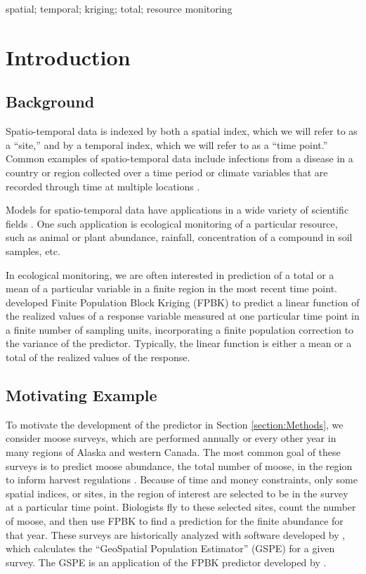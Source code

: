\documentclass[]{interact}
\theoremstyle{plain}%
\theoremstyle{definition}
\theoremstyle{remark}
\begin{document}
\begin{keywords}
spatial; temporal; kriging; total; resource monitoring
\end{keywords}

\section{Introduction}

\subsection{Background}

Spatio-temporal data is indexed by both a spatial index, which we will
refer to as a ``site,'' and by a temporal index, which we will refer to
as a ``time point.'' Common examples of spatio-temporal data include
infections from a disease in a country or region collected over a time
period \citep[e.g.][]{martinez2008autoregressive, sahu2022bayesian} or
climate variables that are recorded through time at multiple locations
\citep{lemos2009spatio}.

Models for spatio-temporal data have applications in a wide variety of
scientific fields \citep[see][ for many examples]{wikle2019spatio}. One
such application is ecological monitoring of a particular resource, such
as animal or plant abundance, rainfall, concentration of a compound in
soil samples, etc.

In ecological monitoring, we are often interested in prediction of a
total or a mean of a particular variable in a finite region in the most
recent time point. \citet{ver2008spatial} developed Finite Population
Block Kriging (FPBK) to predict a linear function of the realized values
of a response variable measured at one particular time point in a finite
number of sampling units, incorporating a finite population correction
to the variance of the predictor. Typically, the linear function is
either a mean or a total of the realized values of the response.

\subsection{Motivating Example}

To motivate the development of the predictor in Section
\ref{section:Methods}, we consider moose surveys, which are performed
annually or every other year in many regions of Alaska and western
Canada. The most common goal of these surveys is to predict moose
abundance, the total number of moose, in the region to inform harvest
regulations \citep{kellie2019challenges}. Because of time and money
constraints, only some spatial indices, or sites, in the region of
interest are selected to be in the survey at a particular time point.
Biologists fly to these selected sites, count the number of moose, and
then use FPBK to find a prediction for the finite abundance for that
year. These surveys are historically analyzed with software developed by
\citet{delong2006geospatial}, which calculates the ``GeoSpatial
Population Estimator'' (GSPE) for a given survey. The GSPE is an
application of the FPBK predictor developed by \citet{ver2008spatial}.
\end{document}
